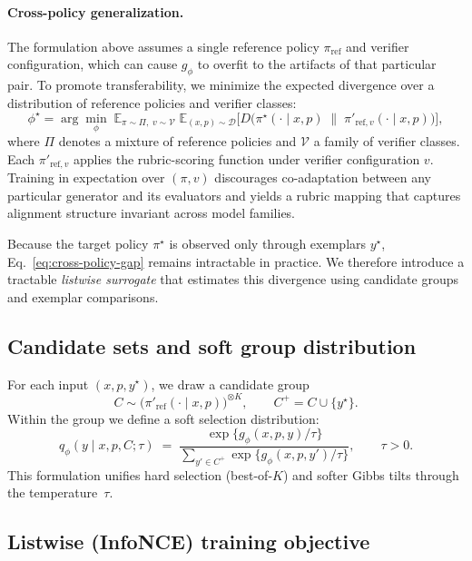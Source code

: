 \documentclass[sigconf]{acmart}
\begin{document}
\paragraph{Cross-policy generalization.}
The formulation above assumes a single reference policy
\(\pi_{\mathrm{ref}}\) and verifier configuration, which can
cause \(g_\phi\) to overfit to the artifacts of that particular pair.
To promote transferability, we minimize the expected divergence over a
distribution of reference policies and verifier classes:
\begin{equation}
\phi^\star
=\arg\min_\phi\;
\mathbb{E}_{\pi\sim\Pi,\;v\sim\mathcal{V}}
\;
\mathbb{E}_{(x,p)\sim\mathcal{D}}
\Big[
D\!\big(
\pi^\star(\cdot\mid x,p)
\;\|\;
\pi'_{\mathrm{ref},v}(\cdot\mid x,p)
\big)
\Big],
\label{eq:cross-policy-gap}
\end{equation}
where \(\Pi\) denotes a mixture of reference policies
and \(\mathcal{V}\) a family of verifier classes.
Each $\pi'_{\mathrm{ref},v}$ applies the rubric-scoring function
under verifier configuration $v$.
Training in expectation over $(\pi,v)$ discourages co-adaptation between
any particular generator and its evaluators and yields a rubric mapping
that captures alignment structure invariant across model families.

Because the target policy \(\pi^\star\) is observed only through exemplars
\(y^\star\), Eq.~\eqref{eq:cross-policy-gap} remains intractable in
practice.  We therefore introduce a tractable \emph{listwise surrogate}
that estimates this divergence using candidate groups and exemplar
comparisons.


\subsection{Candidate sets and soft group distribution}\label{sec:candidate-sets}

For each input $(x,p,y^\star)$, we draw a candidate group
\[
C \sim \big(\pi'_{\text{ref}}(\cdot\mid x,p)\big)^{\otimes K},\qquad 
C^+ = C \cup \{y^\star\}.
\]
Within the group we define a soft selection distribution:
\begin{equation}
q_\phi(y\mid x,p,C;\tau)
\;=\;
\frac{\exp\{g_\phi(x,p,y)/\tau\}}
{\sum_{y'\in C^+}\exp\{g_\phi(x,p,y')/\tau\}},
\qquad \tau>0.
\label{eq:softmax}
\end{equation}
This formulation unifies hard selection (best-of-$K$) and softer Gibbs tilts through the temperature~$\tau$.

\subsection{Listwise (InfoNCE) training objective}\label{sec:listwise}
\end{document}
